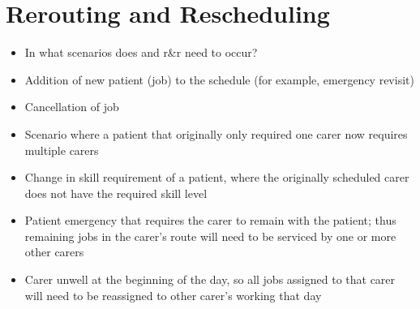 \documentclass[a4paper]{article}
\begin{document}
\section{Rerouting and Rescheduling}
\begin{itemize}[leftmargin=*, itemsep=-0.em]
	\item In what scenarios does and r\&r need to occur?
	\item Addition of new patient (job) to the schedule (for example, emergency revisit)
	\item Cancellation of job
	\item Scenario where a patient that originally only required one carer now requires multiple carers
	\item Change in skill requirement of a patient, where the originally scheduled carer does not have the required skill level
	\item Patient emergency that requires the carer to remain with the patient; thus remaining jobs in the carer's route will need to be serviced by one or more other carers
	\item Carer unwell at the beginning of the day, so all jobs assigned to that carer will need to be reassigned to other carer's working that day	
\end{itemize}	
\end{document}
